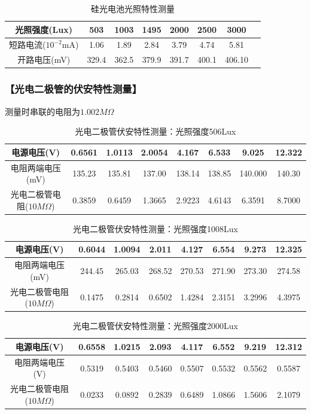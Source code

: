 \documentclass{ctexart}
\let\oldsubsubsection\subsubsection
\renewcommand{\subsubsection}[1]{\oldsubsubsection{\!\!\!\!\!\!【#1】}}
\begin{document}
\begin{table}[H]
  \centering
  \begin{tabular}{|c|c|c|c|c|c|c|c|}
    \hline
    光照强度(Lux) &503&1003&1495&2000&2500&3000\\\hline
    短路电流($10^{-2}$mA) &1.06&1.89&2.84&3.79&4.74&5.81\\\hline
    开路电压(mV) &329.4&362.5&379.9&391.7&400.1&406.10\\\hline
  \end{tabular}
  \caption{硅光电池光照特性测量}
\end{table}

\subsubsection{光电二极管的伏安特性测量}

测量时串联的电阻为$1.002M\Omega$

\begin{table}[H]
  \centering
  \begin{tabular}{|c|c|c|c|c|c|c|c|}
    \hline
    电源电压(V) &0.6561&1.0113&2.0054&4.167&6.533&9.025&12.322\\\hline
    电阻两端电压(mV) &135.23&135.81&137.00&138.14&138.85&140.000&140.30\\\hline
    光电二极管电阻($10M\Omega$) & 0.3859&0.6459&1.3665&2.9223&4.6143&6.3591&8.7000\\\hline
  \end{tabular}
  \caption{光电二极管伏安特性测量：光照强度506Lux}
\end{table}

\begin{table}[H]
  \centering
  \begin{tabular}{|c|c|c|c|c|c|c|c|}
    \hline
    电源电压(V) &0.6044&1.0094&2.011&4.127&6.554&9.273&12.325\\\hline
    电阻两端电压(mV) &244.45&265.03&268.52&270.53&271.90&273.30&274.58\\\hline
    光电二极管电阻($10M\Omega$) & 0.1475&0.2814&0.6502&1.4284&2.3151&3.2996&4.3975\\\hline
  \end{tabular}
  \caption{光电二极管伏安特性测量：光照强度1008Lux}
\end{table}

\begin{table}[H]
  \centering
  \begin{tabular}{|c|c|c|c|c|c|c|c|}
    \hline
    电源电压(V) &0.6558&1.0215&2.093&4.117&6.552&9.219&12.312\\\hline
    电阻两端电压(V) &0.5319&0.5403&0.5460&0.5507&0.5532&0.5562&0.5587\\\hline
    光电二极管电阻($10M\Omega$) & 0.0233&0.0892&0.2839&0.6489&1.0866&1.5606&2.1079\\\hline
  \end{tabular}
  \caption{光电二极管伏安特性测量：光照强度2000Lux}
\end{table}
\end{document}
